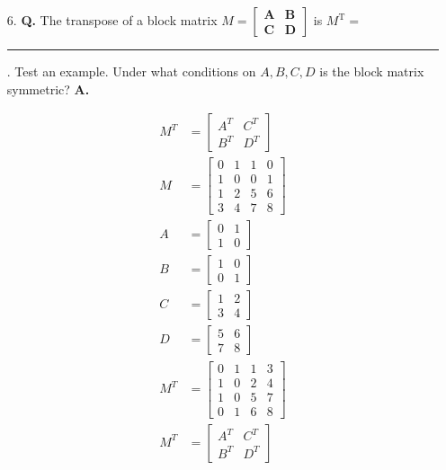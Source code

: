 \documentclass[main.tex]{subfiles}
\begin{document}
\begin{enumerate}
    \item [6.] \textbf{Q.} The transpose of a block matrix $M=\left[\begin{array}{ll}\mathbf{A} & \mathbf{B} \\ \mathbf{C} & \mathbf{D}\end{array}\right]$ is $M^{\mathrm{T}}=$ \rule{1cm}{0.15mm}. Test an example. Under what conditions on $A, B, C, D$ is the block matrix symmetric? \textbf{A.}
    
    $$
    \begin{aligned}
    M^{T} &= \left[\begin{array}{ll}
    A^{T} & C^{T} \\
    B^{T} & D^{T}
    \end{array}\right]\\
    M &= \left[\begin{array}{llll}
    0 & 1 & 1 & 0 \\
    1 & 0 & 0 & 1 \\
    1 & 2 & 5 & 6 \\
    3 & 4 & 7 & 8
    \end{array}\right]\\
    A &= \left[\begin{array}{ll}
    0 & 1 \\
    1 & 0
    \end{array}\right] \\
    B &= \left[\begin{array}{ll}
    1 & 0 \\
    0 & 1
    \end{array}\right]\\
    C &= \left[\begin{array}{ll}
    1 & 2 \\
    3 & 4
    \end{array}\right] \\
    D &= \left[\begin{array}{ll}
    5 & 6 \\
    7 & 8
    \end{array}\right] \\
    M^{T} &= \left[\begin{array}{llll}
    0 & 1 & 1 & 3 \\
    1 & 0 & 2 & 4 \\
    1 & 0 & 5 & 7 \\
    0 & 1 & 6 & 8
    \end{array}\right]\\
    M^{T} &=\left[\begin{array}{ll}
    A^{T} & C^{T} \\
    B^{T} & D^{T}
    \end{array}\right]
    \end{aligned}
    $$
    

\end{enumerate}
\end{document}
